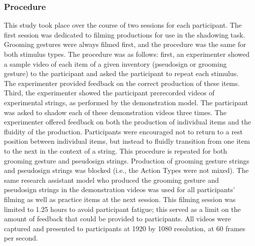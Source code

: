         \subsubsection{Procedure}
            This study took place over the course of two sessions for each participant. The first session was dedicated to filming productions for use in the shadowing task. Grooming gestures were always filmed first, and the procedure was the same for both stimulus types. The procedure was as follows: first, an experimenter showed a sample video of each item of a given inventory (pseudosign or grooming gesture) to the participant and asked the participant to repeat each stimulus. The experimenter provided feedback on the correct production of these items. Third, the experimenter showed the participant prerecorded videos of experimental strings, as performed by the demonstration model. The participant was asked to shadow each of these demonstration videos three times. The experimenter offered feedback on both the production of individual items and the fluidity of the production. Participants were encouraged not to return to a rest position between individual items, but instead to fluidly transition from one item to the next in the context of a string. This procedure is repeated for both grooming gesture and pseudosign strings. Production of grooming gesture strings and pseudosign strings was blocked (i.e., the Action Types were not mixed). The same research assistant model who produced the grooming gesture and pseudosign strings in the demonstration videos was used for all participants’ filming as well as practice items at the next session. This filming session was limited to 1.25 hours to avoid participant fatigue; this served as a limit on the amount of feedback that could be provided to participants. All videos were captured and presented to participants at 1920 by 1080 resolution, at 60 frames per second. \par
